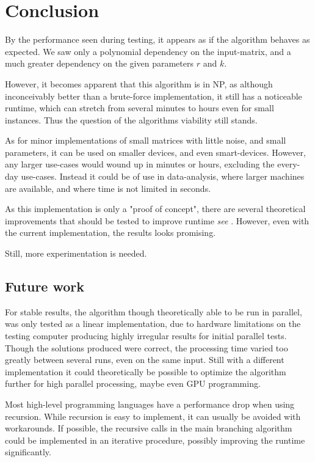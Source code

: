 \documentclass[a4paper]{article}
\begin{document}
%
%

\section{Conclusion}
\label{sec:conclusion}
By the performance seen during testing, it appears as if the algorithm behaves as expected. We saw only a polynomial
dependency on the input-matrix, and a much greater dependency on the given parameters $r$ and $k$.

However, it becomes apparent that this algorithm is in NP, as although inconceivably better than a brute-force
implementation, it still has a noticeable runtime, which can stretch from several minutes to hours even for small instances.
Thus the question of the algorithms viability still stands.

As for minor implementations of small matrices with little noise, and small parameters, it can be used on smaller devices,
and even smart-devices. However, any larger use-cases would wound up in minutes or hours, excluding the every-day use-cases.
Instead it could be of use in data-analysis, where larger machines are available, and where time is not limited in seconds.

As this implementation is only a "proof of concept", there are several theoretical improvements that should be tested to improve
runtime \textit{see }. However, even with the current implementation, the results looks promising.

Still, more experimentation is needed.

\subsection{Future work}
\label{sec:future-work}
For stable results, the algorithm though theoretically able to be run in parallel, was only tested as a linear implementation,
due to hardware limitations on the testing computer producing highly irregular results for initial parallel tests.
Though the solutions produced were correct, the processing time varied too greatly between several runs, even on the same input.
Still with a different implementation it could theoretically be possible to optimize the algorithm further
for high parallel processing, maybe even GPU programming.

Most high-level programming languages have a performance drop when using recursion. While recursion is easy to implement, it can
usually be avoided with workarounds. If possible, the recursive calls in the main branching algorithm could be implemented
in an iterative procedure, possibly improving the runtime significantly.
\end{document}
